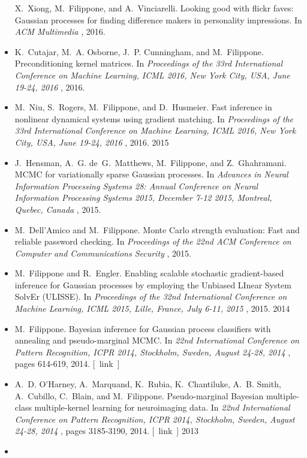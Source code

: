 \documentclass[10pt]{article}
\begin{document}
\begin{itemize}
  X. Xiong, M. Filippone, and A. Vinciarelli. Looking good with flickr faves: Gaussian processes for finding difference makers in personality impressions. In \emph{ACM Multimedia}
, 2016. 

\item 

  K. Cutajar, M. A. Osborne, J. P. Cunningham, and M. Filippone. Preconditioning kernel matrices. In \emph{Proceedings of the 33rd International Conference on Machine Learning, ICML 2016, New York City, USA, June 19-24, 2016}
, 2016. 

\item 

  M. Niu, S. Rogers, M. Filippone, and D. Husmeier. Fast inference in nonlinear dynamical systems using gradient matching. In \emph{Proceedings of the 33rd International Conference on Machine Learning, ICML 2016, New York City, USA, June 19-24, 2016}
, 2016. 
2015
\item 

  J. Hensman, A. G. de G. Matthews, M. Filippone, and Z. Ghahramani. MCMC for variationally sparse Gaussian processes. In \emph{Advances in Neural Information Processing Systems 28: Annual Conference on Neural Information Processing Systems 2015, December 7-12 2015, Montreal, Quebec, Canada}
, 2015. 

\item 

  M. Dell'Amico and M. Filippone. Monte Carlo strength evaluation: Fast and reliable password checking. In \emph{Proceedings of the 22nd ACM Conference on Computer and Communications Security}
, 2015. 

\item 

  M. Filippone and R. Engler. Enabling scalable stochastic gradient-based inference for Gaussian processes by employing the Unbiased LInear System SolvEr (ULISSE). In \emph{Proceedings of the 32nd International Conference on Machine Learning, ICML 2015, Lille, France, July 6-11, 2015}
, 2015. 
2014
\item 

  M. Filippone. Bayesian inference for Gaussian process classifiers with annealing and pseudo-marginal MCMC. In \emph{22nd International Conference on Pattern Recognition, ICPR 2014, Stockholm, Sweden, August 24-28, 2014}
, pages 614-619, 2014. [ link ] 

\item 

  A. D. O'Harney, A. Marquand, K. Rubia, K. Chantiluke, A. B. Smith, A. Cubillo, C. Blain, and M. Filippone. Pseudo-marginal Bayesian multiple-class multiple-kernel learning for neuroimaging data. In \emph{22nd International Conference on Pattern Recognition, ICPR 2014, Stockholm, Sweden, August 24-28, 2014}
, pages 3185-3190, 2014. [ link ] 
2013
\item 


\end{itemize}
\end{document}
